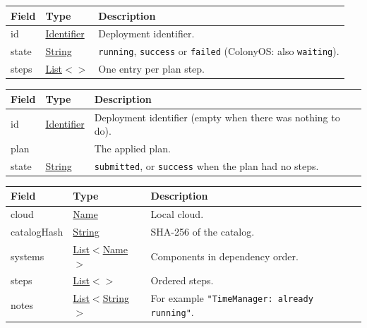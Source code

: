 \documentclass[a4paper]{arrowhead}
\newcommand{\mref}[2][]{{\textcolor{ArrowheadPurple}{\hyperref[sec:model:#2]{\ifstrempty{#1}{#2}{#1}}}}}
\newcommand{\pref}[1]{{\textcolor{ArrowheadGrey}{\hyperref[sec:model:primitives:#1]{#1}}}}
\begin{document}

\noindent\begin{tabularx}{\textwidth}{| >{\raggedright\arraybackslash}p{3.6cm} | >{\raggedright\arraybackslash\small}p{4.4cm} | X |} \hline
\rowcolor{gray!33} Field & Type & Description \\ \hline
id & \pref{Identifier} & Deployment identifier. \\ \hline
state & \pref{String} & \texttt{running}, \texttt{success} or \texttt{failed} (ColonyOS: also \texttt{waiting}). \\ \hline
steps & \pref{List}$<$\mref{StepState}$>$ & One entry per plan step. \\ \hline
\end{tabularx}


\noindent\begin{tabularx}{\textwidth}{| >{\raggedright\arraybackslash}p{3.6cm} | >{\raggedright\arraybackslash\small}p{4.4cm} | X |} \hline
\rowcolor{gray!33} Field & Type & Description \\ \hline
id & \pref{Identifier} & Deployment identifier (empty when there was nothing to do). \\ \hline
plan & \mref{Plan} & The applied plan. \\ \hline
state & \pref{String} & \texttt{submitted}, or \texttt{success} when the plan had no steps. \\ \hline
\end{tabularx}


\noindent\begin{tabularx}{\textwidth}{| >{\raggedright\arraybackslash}p{3.6cm} | >{\raggedright\arraybackslash\small}p{4.4cm} | X |} \hline
\rowcolor{gray!33} Field & Type & Description \\ \hline
cloud & \pref{Name} & Local cloud. \\ \hline
catalogHash & \pref{String} & SHA-256 of the catalog. \\ \hline
systems & \pref{List}$<$\pref{Name}$>$ & Components in dependency order. \\ \hline
steps & \pref{List}$<$\mref{Step}$>$ & Ordered steps. \\ \hline
notes & \pref{List}$<$\pref{String}$>$ & For example \texttt{"TimeManager: already running"}. \\ \hline
\end{tabularx}
\end{document}

